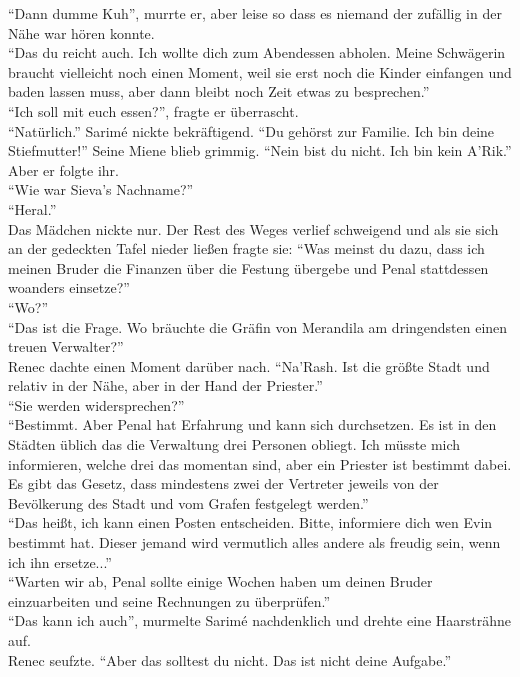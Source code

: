 ``Dann dumme Kuh'', murrte er, aber leise so dass es niemand der zufällig in der Nähe war hören 
konnte.\\
``Das du reicht auch. Ich wollte dich zum Abendessen abholen. Meine Schwägerin braucht vielleicht 
noch einen Moment, weil sie erst noch die Kinder einfangen und baden lassen muss, aber dann bleibt 
noch Zeit etwas zu besprechen.''\\
``Ich soll mit euch essen?'', fragte er überrascht.\\
``Natürlich.'' Sarimé nickte bekräftigend. ``Du gehörst zur Familie. Ich bin deine Stiefmutter!''
Seine Miene blieb grimmig. ``Nein bist du nicht. Ich bin kein A'Rik.''\\
Aber er folgte ihr.\\
``Wie war Sieva's Nachname?''\\
``Heral.''\\
Das Mädchen nickte nur. Der Rest des Weges verlief schweigend und als sie sich an der gedeckten 
Tafel nieder ließen fragte sie: ``Was meinst du dazu, dass ich meinen Bruder die Finanzen über die 
Festung übergebe und Penal stattdessen woanders einsetze?''\\
``Wo?''\\
``Das ist die Frage. Wo bräuchte die Gräfin von Merandila am dringendsten einen treuen 
Verwalter?''\\
Renec dachte einen Moment darüber nach. ``Na'Rash. Ist die größte Stadt und relativ in der Nähe, 
aber in der Hand der Priester.''\\
``Sie werden widersprechen?'' \\
``Bestimmt. Aber Penal hat Erfahrung und kann sich durchsetzen. Es ist in den Städten üblich das 
die Verwaltung drei Personen obliegt. Ich müsste mich informieren, welche drei das momentan sind, 
aber ein Priester ist bestimmt dabei. Es gibt das Gesetz, dass mindestens zwei der Vertreter 
jeweils von der Bevölkerung des Stadt und vom Grafen festgelegt werden.''\\
``Das heißt, ich kann einen Posten entscheiden. Bitte, informiere dich wen Evin bestimmt hat. 
Dieser jemand wird vermutlich alles andere als freudig sein, wenn ich ihn ersetze...''\\
``Warten wir ab, Penal sollte einige Wochen haben um deinen Bruder einzuarbeiten und seine 
Rechnungen zu überprüfen.''\\
``Das kann ich auch'', murmelte Sarimé nachdenklich und drehte eine Haarsträhne auf.\\
Renec seufzte. ``Aber das solltest du nicht. Das ist nicht deine Aufgabe.''\\
